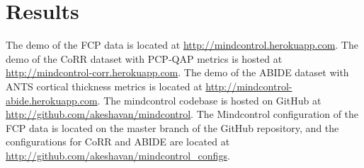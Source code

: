 \section{Results}

The demo of the FCP data is located at \href{http://mindcontrol.herokuapp.com}{http://mindcontrol.herokuapp.com}. The demo of the CoRR dataset with PCP-QAP metrics is hosted at \href{http://mindcontrol-corr.herokuapp.com}{http://mindcontrol-corr.herokuapp.com}. The demo of the ABIDE dataset with ANTS cortical thickness metrics is located at \href{http://mindcontrol-abide.herokuapp.com}{http://mindcontrol-abide.herokuapp.com}. The mindcontrol codebase is hosted on GitHub at \href{http://github.com/akeshavan/mindcontrol}{http://github.com/akeshavan/mindcontrol}. The Mindcontrol configuration of the FCP data is located on the master branch of the GitHub repository, and the configurations for CoRR and ABIDE are located at \href{http://github.com/akeshavan/mindcontrol_configs}{http://github.com/akeshavan/mindcontrol_configs}.

